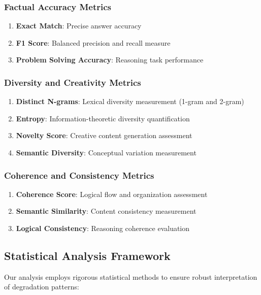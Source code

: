 \documentclass{article}
\begin{document}
\subsubsection{Factual Accuracy Metrics}
\begin{enumerate}
    \item \textbf{Exact Match}: Precise answer accuracy
    \item \textbf{F1 Score}: Balanced precision and recall measure
    \item \textbf{Problem Solving Accuracy}: Reasoning task performance
\end{enumerate}

\subsubsection{Diversity and Creativity Metrics}
\begin{enumerate}
    \item \textbf{Distinct N-grams}: Lexical diversity measurement (1-gram and 2-gram)
    \item \textbf{Entropy}: Information-theoretic diversity quantification
    \item \textbf{Novelty Score}: Creative content generation assessment
    \item \textbf{Semantic Diversity}: Conceptual variation measurement
\end{enumerate}

\subsubsection{Coherence and Consistency Metrics}
\begin{enumerate}
    \item \textbf{Coherence Score}: Logical flow and organization assessment
    \item \textbf{Semantic Similarity}: Content consistency measurement
    \item \textbf{Logical Consistency}: Reasoning coherence evaluation
\end{enumerate}

\subsection{Statistical Analysis Framework}

Our analysis employs rigorous statistical methods to ensure robust interpretation of degradation patterns:
\end{document}
